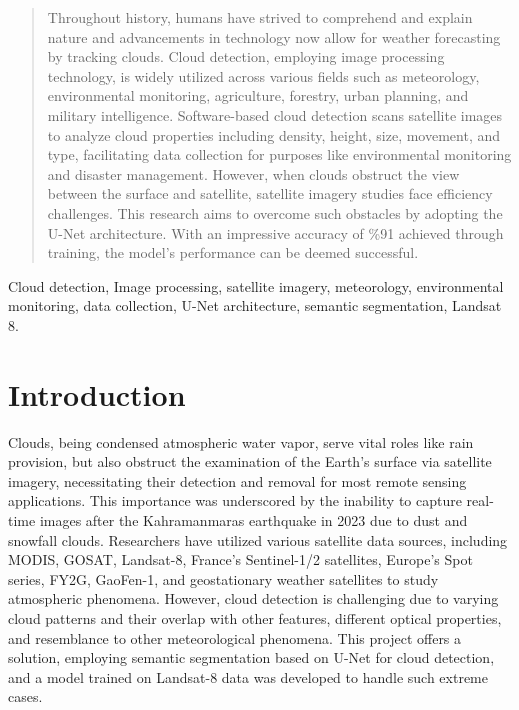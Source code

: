 \documentclass[conference]{IEEEtran}
\begin{document}
\begin{abstract}

Throughout history, humans have strived to comprehend and explain nature and advancements in technology now allow for weather forecasting by tracking clouds. Cloud detection, employing image processing technology, is widely utilized across various fields such as meteorology, environmental monitoring, agriculture, forestry, urban planning, and military intelligence. Software-based cloud detection scans satellite images to analyze cloud properties including density, height, size, movement, and type, facilitating data collection for purposes like environmental monitoring and disaster management. However, when clouds obstruct the view between the surface and satellite, satellite imagery studies face efficiency challenges. This research aims to overcome such obstacles by adopting the U-Net architecture. With an impressive accuracy of \%91 achieved through training, the model's performance can be deemed successful.
\end{abstract}
\begin{IEEEkeywords}
Cloud detection, Image processing, satellite imagery, meteorology, environmental monitoring, data collection, U-Net architecture, semantic segmentation,  Landsat 8.
\end{IEEEkeywords}


\section{Introduction}

Clouds, being condensed atmospheric water vapor, serve vital roles like rain provision, but also obstruct the examination of the Earth's surface via satellite imagery, necessitating their detection and removal for most remote sensing applications. This importance was underscored by the inability to capture real-time images after the Kahramanmaras earthquake in 2023 due to dust and snowfall clouds. Researchers have utilized various satellite data sources, including MODIS, GOSAT, Landsat-8, France's Sentinel-1/2 satellites, Europe's Spot series, FY2G, GaoFen-1, and geostationary weather satellites to study atmospheric phenomena. However, cloud detection is challenging due to varying cloud patterns and their overlap with other features, different optical properties, and resemblance to other meteorological phenomena. This project offers a solution, employing semantic segmentation based on U-Net for cloud detection, and a model trained on Landsat-8 data was developed to handle such extreme cases.
\end{document}
